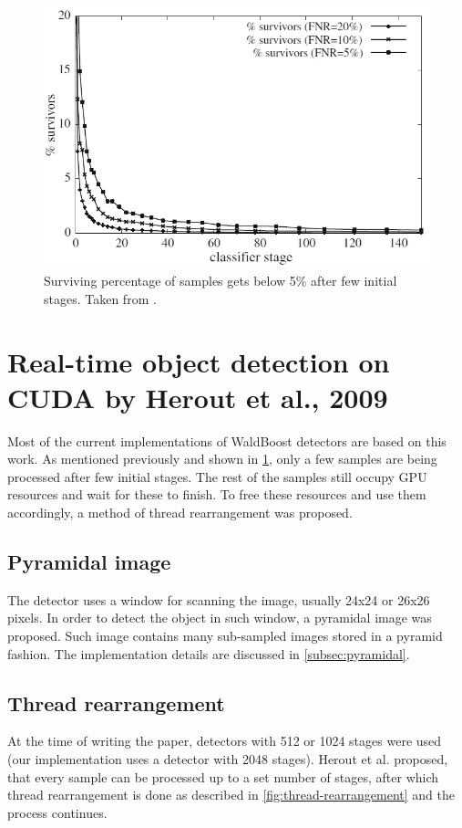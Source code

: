\begin{center}
\begin{figure}[h]
	\centering\includegraphics[width=0.6\linewidth]{fig/survivors.png}
	\caption{Surviving percentage of samples gets below 5\% after few initial stages. Taken from \cite{herout-realtime-cuda}.}
	\label{fig:survivors}
\end{figure}
\end{center}

\section{Real-time object detection on CUDA by Herout et al., 2009}

Most of the current implementations of WaldBoost detectors are based on this work. As mentioned previously and shown in \ref{fig:survivors}, only a few samples are being processed after few initial stages. The rest of the samples still occupy GPU resources and wait for these to finish. To free these resources and use them accordingly, a method of thread rearrangement was proposed.

\subsection{Pyramidal image}

The detector uses a window for scanning the image, usually 24x24 or 26x26 pixels. In order to detect the object in such window, a pyramidal image was proposed. Such image contains many sub-sampled images stored in a pyramid fashion. The implementation details are discussed in \ref{subsec:pyramidal}.

\subsection{Thread rearrangement}

At the time of writing the paper, detectors with 512 or 1024 stages were used (our implementation uses a detector with 2048 stages). Herout et al. proposed, that every sample can be processed up to a set number of stages, after which thread rearrangement is done as described in \ref{fig:thread-rearrangement} and the process continues.

